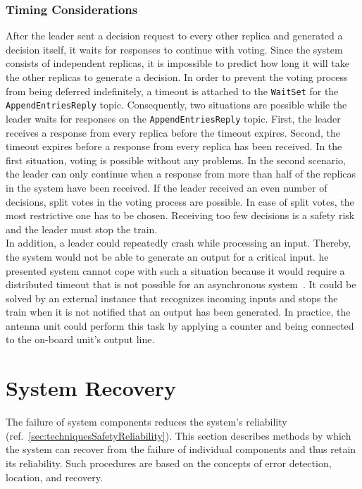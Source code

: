 \subsubsection{Timing Considerations}

After the leader sent a decision request to every other replica and generated a decision itself, it waits for responses to continue with voting.
Since the system consists of independent replicas, it is impossible to predict how long it will take the other replicas to generate a decision.
In order to prevent the voting process from being deferred indefinitely, a timeout is attached to the \texttt{WaitSet} for the \texttt{AppendEntriesReply} topic.
Consequently, two situations are possible while the leader waits for responses on the \texttt{AppendEntriesReply} topic.
First, the leader receives a response from every replica before the timeout expires.
Second, the timeout expires before a response from every replica has been received.
In the first situation, voting is possible without any problems.
In the second scenario, the leader can only continue when a response from more than half of the replicas in the system have been received.
If the leader received an even number of decisions, split votes in the voting process are possible.
In case of split votes, the most restrictive one has to be chosen.
Receiving too few decisions is a safety risk and the leader must stop the train.
\\

In addition, a leader could repeatedly crash while processing an input.
Thereby, the system would not be able to generate an output for a critical input.
he presented system cannot cope with such a situation because it would require a distributed timeout that is not possible for an asynchronous system~\cite{FLPProblemConsensus}.
It could be solved by an external instance that recognizes incoming inputs and stops the train when it is not notified that an output has been generated.
In practice, the antenna unit could perform this task by applying a counter and being connected to the on-board unit's output line.

\section{System Recovery}

The failure of system components reduces the system's reliability (ref.~\autoref{sec:techniquesSafetyReliability}).
This section describes methods by which the system can recover from the failure of individual components and thus retain its reliability.
Such procedures are based on the concepts of error detection, location, and recovery.
\\

